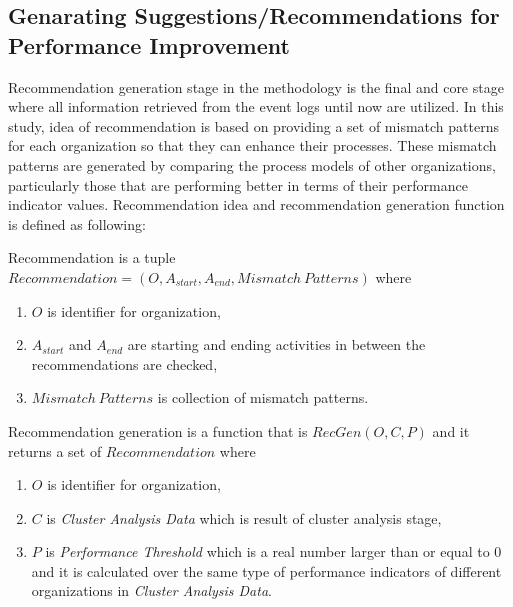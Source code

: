 \subsection{Genarating Suggestions/Recommendations for Performance Improvement}
\label{subsec:recommendation-generation}
\theoremstyle{definition}
Recommendation generation stage in the methodology is the final and core stage where all information retrieved from the event logs until now are utilized. In this study, idea of recommendation is based on providing a set of mismatch patterns for each organization so that they can enhance their processes. These mismatch patterns are generated by comparing the process models of other organizations, particularly those that are performing better in terms of their performance indicator values. Recommendation idea and recommendation generation function is defined as following:
\begin{definition}
Recommendation is a tuple ${Recommendation} = (O, A_{start}, A_{end}, Mismatch\ Patterns) $ where 
  \begin{enumerate}
    \item $O$ is identifier for organization,
    \item $A_{start}$ and $A_{end}$ are starting and ending activities in between the recommendations are checked,
    \item $Mismatch\ Patterns$ is collection of mismatch patterns.
  \end{enumerate}
\end{definition}

\theoremstyle{definition}
\begin{definition}
Recommendation generation is a function that is $RecGen(O, C, P)$ and it returns a set of $Recommendation$ where
  \begin{enumerate}
    \item $O$ is identifier for organization,
    \item $C$ is \textit{Cluster Analysis Data} which is result of cluster analysis stage,
    \item $P$ is \textit{Performance Threshold} which is a real number larger than or equal to 0 and it is calculated over the same type of performance indicators of different organizations in \textit{Cluster Analysis Data}.
  \end{enumerate}
\end{definition}

